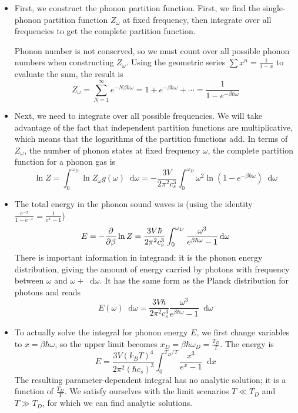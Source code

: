 \documentclass[11pt, a4paper]{article}
\newcommand{\diff}{\mathop{}\!\mathrm{d}} %
\begin{document}
\begin{itemize}
	\item First, we construct the phonon partition function. First, we find the single-phonon partition function $ Z_{\omega} $ at fixed frequency, then integrate over all frequencies to get the complete partition function. 
	
	Phonon number is not conserved, so we must count over all possible phonon numbers when constructing $ Z_{\omega} $. Using the geometric series $ \sum x^{n} = \frac{1}{1 - x}$ to evaluate the sum, the result is
	\begin{equation*}
		Z_{\omega} = \sum_{N=1}^{\infty}e^{-N \beta\hbar \omega} = 1 + e^{-\beta \hbar \omega} + \cdots = \frac{1}{1 - e^{-\beta \hbar \omega}}
	\end{equation*}
	
	\item Next, we need to integrate over all possible frequencies. We will take advantage of the fact that independent partition functions are multiplicative, which means that the logarithms of the partition functions add. In terms of $ Z_{\omega} $, the number of phonon states at fixed frequency $ \omega $, the complete partition function for a phonon gas is
	\begin{equation*}
		\ln Z = \int_{0}^{\omega_{D}} \ln Z_{\omega}g(\omega)\diff \omega = - \frac{3V}{2\pi^{2}c_{s}^{3}}\int_{0}^{\omega_{D}} \omega^{2} \ln(1-e^{-\beta \hbar \omega})\diff \omega
	\end{equation*}
	
	\item The total energy in the phonon sound waves is (using the identity $\frac{e^{-x}}{1-e^{-x}} = \frac{1}{e^{x} -1}$)
	\begin{equation*}
		E = -\pdv{}{\beta} \ln Z = \frac{3V\hbar}{2\pi^{2}c_{s}^{3}} \int_{0}^{\omega_{D}}\frac{\omega^{3}}{e^{\beta\hbar\omega}-1} \diff \omega
	\end{equation*}
	There is important information in integrand: it is the phonon energy distribution, giving the amount of energy carried by photons with frequency between $ \omega $ and $ \omega + \diff \omega$. It has the same form as the Planck distribution for photons and reads
	\begin{equation*}
		E(\omega) \diff \omega = \frac{3V\hbar}{2\pi^{2}c_{s}^{3}}\frac{\omega^{3}}{e^{\beta \hbar \omega} - 1}\diff \omega
	\end{equation*}
	
	\item To actually solve the integral for phonon energy $ E $, we first change variables to $ x = \beta \hbar \omega $, so the upper limit becomes $ x_{D} = \beta \hbar \omega_{D} = \frac{T_{D}}{T} $. The energy is
	\begin{equation*}
		E = \frac{3V(k_{B}T)^{4}}{2\pi^{2}(\hbar c_{s})^{3}} \int_{0}^{T_{D}/T} \frac{x^{3}}{e^{x}-1}\diff x
	\end{equation*}
	The resulting parameter-dependent integral has no analytic solution; it is a function of $ \frac{T_{D}}{T} $. We satisfy ourselves with the limit scenarios $ T\ll T_{D} $ and $ T \gg T_{D} $, for which we can find analytic solutions.
	

\end{itemize}
\end{document}
